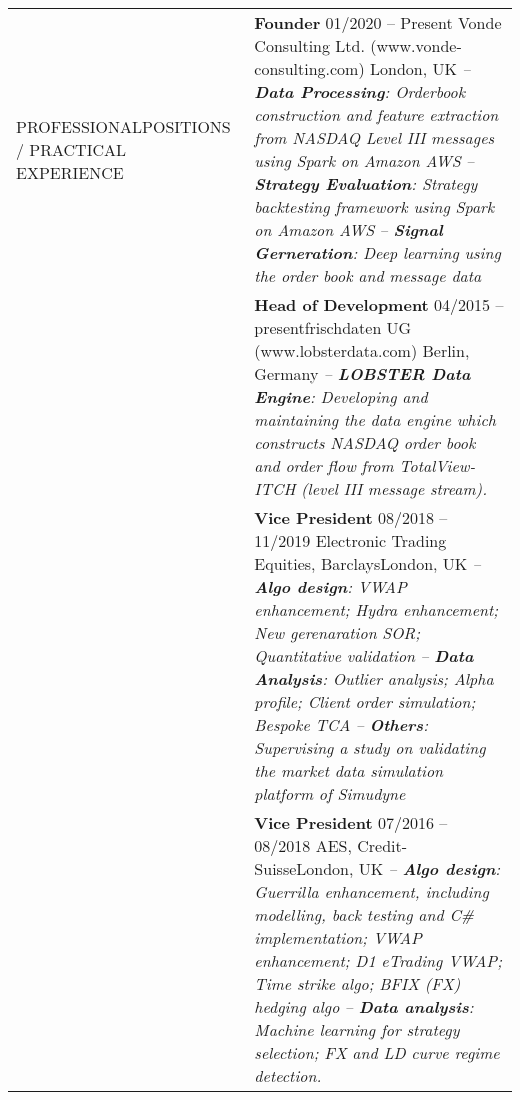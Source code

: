 \documentclass[a4paper,10pt]{article}
\begin{document}
\begin{longtable}[h]{p{}p{}}
  PROFESSIONAL\newline POSITIONS / \newline PRACTICAL \newline EXPERIENCE 
    & \textbf{Founder} \hfill 01/2020 -- Present \newline Vonde Consulting Ltd. (www.vonde-consulting.com) \hfill London, UK\newline 
    \emph{-- \textbf{Data Processing}: Orderbook construction and feature extraction from NASDAQ Level III messages using Spark on Amazon AWS}\newline
    \emph{-- \textbf{Strategy Evaluation}: Strategy backtesting framework using Spark on Amazon AWS} \newline
    \emph{-- \textbf{Signal Gerneration}: Deep learning using the order book and message data}\\ 
    & \textbf{Head of Development} \hfill 04/2015 -- present\newline frischdaten UG (www.lobsterdata.com) \hfill Berlin, Germany \newline  
    \emph{-- \textbf{LOBSTER Data Engine}: Developing and maintaining the data engine which constructs NASDAQ order book and order flow from TotalView-ITCH (level III message stream). } \\
  & \textbf{Vice President} \hfill 08/2018 -- 11/2019 \newline Electronic Trading Equities, Barclays\hfill London, UK\newline  
    \emph{-- \textbf{Algo design}: VWAP enhancement; Hydra enhancement; New gerenaration SOR; Quantitative validation}\newline 
    \emph{-- \textbf{Data Analysis}: Outlier analysis; Alpha profile; Client order simulation; Bespoke TCA}\newline
    \emph{-- \textbf{Others}: Supervising a study on validating the market data simulation platform of Simudyne}\\
  & \textbf{Vice President} \hfill 07/2016 -- 08/2018 \newline AES, Credit-Suisse\hfill London, UK\newline  
    \emph{-- \textbf{Algo design}: Guerrilla enhancement, including modelling, back testing and C\# implementation; VWAP enhancement; D1 eTrading VWAP; Time strike algo; BFIX (FX) hedging algo}\newline 
    \emph{-- \textbf{Data analysis}: Machine learning for strategy selection; FX and LD curve regime detection.}\newline 

\end{longtable}
\end{document}
